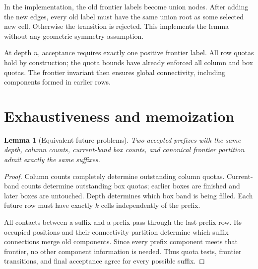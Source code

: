 \documentclass[11pt,a4paper]{article}
\newtheorem{lemma}{Lemma}
\begin{document}
In the implementation, the old frontier labels become union nodes. After
adding the new edges, every old label must have the same union root as some
selected new cell. Otherwise the transition is rejected. This implements the
lemma without any geometric symmetry assumption.

At depth $n$, acceptance requires exactly one positive frontier label.
All row quotas hold by construction; the quota bounds have already enforced
all column and box quotas. The frontier invariant then ensures global
connectivity, including components formed in earlier rows.

\clearpage
\section{Exhaustiveness and memoization}\label{sec:complete}
\begin{lemma}[Equivalent future problems]
Two accepted prefixes with the same depth, column counts, current-band box
counts, and canonical frontier partition admit exactly the same suffixes.
\end{lemma}
\begin{proof}
Column counts completely determine outstanding column quotas. Current-band
counts determine outstanding box quotas; earlier boxes are finished and
later boxes are untouched. Depth determines which box band is being filled.
Each future row must have exactly $k$ cells independently of the prefix.

All contacts between a suffix and a prefix pass through the last prefix row.
Its occupied positions and their connectivity partition determine which
suffix connections merge old components. Since every prefix component meets
that frontier, no other component information is needed. Thus quota tests,
frontier transitions, and final acceptance agree for every possible suffix.
\end{proof}
\end{document}
